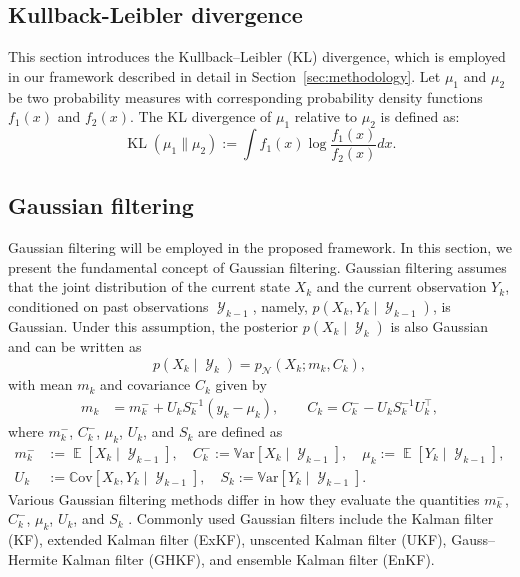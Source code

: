\documentclass[preprint,3p,times]{elsarticle}
\DeclareMathOperator{\E}{\mathbb{E}}
\newcommand{\Var}{\mathbb{V}\mathrm{ar}}
\newcommand{\Cov}{\mathbb{C}\mathrm{ov}}
\DeclareMathOperator{\Y}{\mathcal{Y}}
\DeclareMathOperator{\KL}{KL}
\newcommand{\pdense}{p}
\begin{document}
\subsection{Kullback-Leibler divergence}
\label{sec:metrics_dist}
This section introduces the Kullback–Leibler (KL) divergence, which is employed in our framework described in detail in Section~\ref{sec:methodology}. Let $\mu_1$ and $\mu_2$ be two probability measures with corresponding probability density functions $f_1(x)$ and $f_2(x)$. The KL divergence of $\mu_1$ relative to $\mu_2$ is defined as:
\begin{equation}
\KL(\mu_1 \lVert \mu_2) := \int f_1(x)\log \frac{f_1(x)}{f_2(x)}dx.
\end{equation}



\subsection{Gaussian filtering}
\label{sec:gf_intro}
Gaussian filtering will be employed in the proposed framework. In this section, we present the fundamental concept of Gaussian filtering. 
%
Gaussian filtering assumes that the joint distribution of the current state $X_k$ and the current observation $Y_k$, conditioned on past observations $\Y_{k-1}$, namely, $\pdense \left(X_k,Y_k \mid \Y_{k-1}\right)$, is Gaussian. Under this assumption, the posterior $p(X_k \mid \Y_k)$ is also Gaussian and can be written as
\begin{equation*}
p(X_k \mid \Y_k) = p_{\mathcal{N}}(X_k; m_k, C_k),
\end{equation*}
with mean $m_k$ and covariance $C_k$ given by
\begin{align}
m_k &= m_k^- + U_k S_k^{-1}(y_k - \mu_k), \qquad 
C_k = C_k^- - U_k S_k^{-1} U_k^\top,
\label{eq:post_mean_cov}
\end{align}
where $m_k^-$, $C_k^-$, $\mu_k$, $U_k$, and $S_k$ are defined as
\begin{equation}\label{eq:GF_eqs}
\begin{split}
m_k^- &:= \E[X_k \mid \Y_{k-1}], \quad 
C_k^- := \Var[X_k \mid \Y_{k-1}], \quad 
\mu_k := \E[Y_k \mid \Y_{k-1}], \\
U_k &:= \Cov[X_k,Y_k \mid \Y_{k-1}], \quad 
S_k := \Var[Y_k \mid \Y_{k-1}].
\end{split}
\end{equation}
Various Gaussian filtering methods differ in how they evaluate the quantities $m_k^-$, $C_k^-$, $\mu_k$, $U_k$, and $S_k$ \cite{bayesian_filter}. Commonly used Gaussian filters include the Kalman filter (KF), extended Kalman filter (ExKF), unscented Kalman filter (UKF), Gauss–Hermite Kalman filter (GHKF), and ensemble Kalman filter (EnKF).
\end{document}

